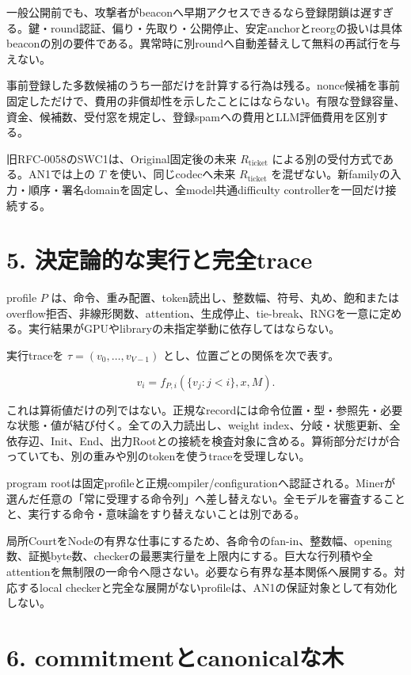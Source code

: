 \documentclass[
  10pt,
]{article}
\begin{document}
一般公開前でも、攻撃者がbeaconへ早期アクセスできるなら登録閉鎖は遅すぎる。鍵・round認証、偏り・先取り・公開停止、安定anchorとreorgの扱いは具体beaconの別の要件である。異常時に別roundへ自動差替えして無料の再試行を与えない。

事前登録した多数候補のうち一部だけを計算する行為は残る。nonce候補を事前固定しただけで、費用の非償却性を示したことにはならない。有限な登録容量、資金、候補数、受付窓を規定し、登録spamへの費用とLLM評価費用を区別する。

旧RFC-0058のSWC1は、Original固定後の未来 \(R_{\mathrm{ticket}}\)
による別の受付方式である。AN1では上の \(T\) を使い、同じcodecへ未来
\(R_{\mathrm{ticket}}\)
を混ぜない。新familyの入力・順序・署名domainを固定し、全model共通difficulty
controllerを一回だけ接続する。

\section{5.
決定論的な実行と完全trace}\label{ux6c7aux5b9aux8ad6ux7684ux306aux5b9fux884cux3068ux5b8cux5168trace}

profile \(P\)
は、命令、重み配置、token読出し、整数幅、符号、丸め、飽和またはoverflow拒否、非線形関数、attention、生成停止、tie-break、RNGを一意に定める。実行結果がGPUやlibraryの未指定挙動に依存してはならない。

実行traceを \(\tau=(v_0,\ldots,v_{V-1})\)
とし、位置ごとの関係を次で表す。

\[v_i=f_{P,i}(\{v_j:j<i\},x,M).\]

これは算術値だけの列ではない。正規なrecordには命令位置・型・参照先・必要な状態・値が結び付く。全ての入力読出し、weight
index、分岐・状態更新、全依存辺、Init、End、出力Rootとの接続を検査対象に含める。算術部分だけが合っていても、別の重みや別のtokenを使うtraceを受理しない。

program
rootは固定profileと正規compiler/configurationへ認証される。Minerが選んだ任意の「常に受理する命令列」へ差し替えない。全モデルを審査することと、実行する命令・意味論をすり替えないことは別である。

局所CourtをNodeの有界な仕事にするため、各命令のfan-in、整数幅、opening数、証拠byte数、checkerの最悪実行量を上限内にする。巨大な行列積や全attentionを無制限の一命令へ隠さない。必要なら有界な基本関係へ展開する。対応するlocal
checkerと完全な展開がないprofileは、AN1の保証対象として有効化しない。

\section{6.
commitmentとcanonicalな木}\label{commitmentux3068canonicalux306aux6728}
\end{document}
